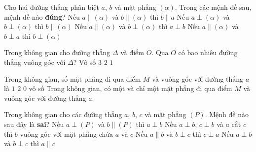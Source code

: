 \begin{ex}%
	Cho hai đường thẳng phân biệt $a$, $b$ và mặt phẳng $(\alpha)$. Trong các mệnh đề sau, mệnh đề nào \textbf{đúng}?
	\choice
	{Nếu $a\parallel (\alpha)$ và $b\parallel (\alpha)$ thì $b\parallel a$}
	{Nếu $a\perp (\alpha)$ và $b\perp (\alpha)$ thì $b\parallel (\alpha)$}
	{\True Nếu $a\parallel (\alpha)$ và $b\perp (\alpha)$ thì $a\perp b$}
	{Nếu $a\parallel (\alpha)$ và $b\perp a$ thì $b\perp (\alpha)$}
\end{ex}
\begin{ex}%
	Trong không gian cho đường thẳng $\Delta$ và điểm $O$. Qua $O$ có bao nhiêu đường thẳng vuông góc với $\Delta$?
	\choice
	{\True Vô số}
	{$3$}
	{$2$}
	{$1$}
\end{ex}
\begin{ex}%
	Trong không gian, số mặt phẳng đi qua điểm $M$ và vuông góc với đường thẳng $a$ là
	\choice
	{\True $1$}
	{$2$}
	{$0$}
	{vô số}
	\loigiai
	{
	Trong không gian, có một và chỉ một mặt phẳng đi qua điểm $M$ và vuông góc với đường thẳng $a$.
	}
\end{ex}
\begin{ex}%
	Trong không gian cho các đường thẳng $a$, $b$, $c$ và mặt phẳng $(P)$. Mệnh đề nào sau đây là \textbf{sai}?
	\choice
	{Nếu $a\perp (P)$ và $b\parallel (P)$ thì $a\perp b$}
	{Nếu $a\perp b$, $c\perp b$ và $a$ cắt $c$ thì $b$ vuông góc với mặt phẳng chứa $a$ và $c$}
	{Nếu $a\parallel b$ và $b\perp c$ thì $c\perp a$}
	{\True Nếu $a\perp b$ và $b\perp c$ thì $a\parallel c$}
\end{ex}
